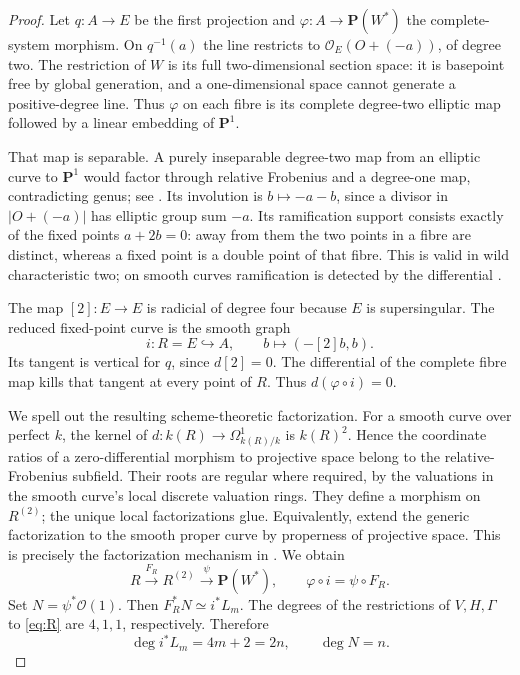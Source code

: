 \documentclass[11pt]{article}
\theoremstyle{remark}\newtheorem{remark}[theorem]{Remark}
\newcommand{\OO}{\mathcal O}
\newcommand{\PP}{\mathbf P}
\begin{document}
\begin{proof}
Let $q:A\to E$ be the first projection and $\varphi:A\to\PP(W^*)$ the complete-system morphism. On $q^{-1}(a)$ the line restricts to $\OO_E(O+(-a))$, of degree two. The restriction of $W$ is its full two-dimensional section space: it is basepoint free by global generation, and a one-dimensional space cannot generate a positive-degree line. Thus $\varphi$ on each fibre is its complete degree-two elliptic map followed by a linear embedding of $\PP^1$.

That map is separable. A purely inseparable degree-two map from an elliptic curve to $\PP^1$ would factor through relative Frobenius and a degree-one map, contradicting genus; see \citet[Lemmas~53.13.3--53.13.5, with proofs]{StacksFrob}. Its involution is $b\mapsto-a-b$, since a divisor in $|O+(-a)|$ has elliptic group sum $-a$. Its ramification support consists exactly of the fixed points $a+2b=0$: away from them the two points in a fibre are distinct, whereas a fixed point is a double point of that fibre. This is valid in wild characteristic two; on smooth curves ramification is detected by the differential \citep[Lemma~53.12.1]{StacksRam}.

The map $[2]:E\to E$ is radicial of degree four because $E$ is supersingular. The reduced fixed-point curve is the smooth graph
\begin{equation}\label{eq:R}
                    i:R=E\hookrightarrow A,\qquad
                    b\longmapsto(-[2]b,b).
\end{equation}
Its tangent is vertical for $q$, since $d[2]=0$. The differential of the complete fibre map kills that tangent at every point of $R$. Thus $d(\varphi\circ i)=0$.

We spell out the resulting scheme-theoretic factorization. For a smooth curve over perfect $k$, the kernel of $d:k(R)\to\Omega^1_{k(R)/k}$ is $k(R)^2$. Hence the coordinate ratios of a zero-differential morphism to projective space belong to the relative-Frobenius subfield. Their roots are regular where required, by the valuations in the smooth curve's local discrete valuation rings. They define a morphism on $R^{(2)}$; the unique local factorizations glue. Equivalently, extend the generic factorization to the smooth proper curve by properness of projective space. This is precisely the factorization mechanism in \citet[Lemma~53.13.8, full proof]{StacksFrob}. We obtain
\[
 R\xrightarrow{F_R}R^{(2)}\xrightarrow{\psi}\PP(W^*),
 \qquad \varphi\circ i=\psi\circ F_R.
\]
Set $N=\psi^*\OO(1)$. Then $F_R^*N\simeq i^*L_m$. The degrees of the restrictions of $V,H,\Gamma$ to \eqref{eq:R} are $4,1,1$, respectively. Therefore
\begin{equation}\label{eq:restriction-degree}
                         \deg i^*L_m=4m+2=2n,
                         \qquad\deg N=n.
\end{equation}


\end{proof}
\end{document}
